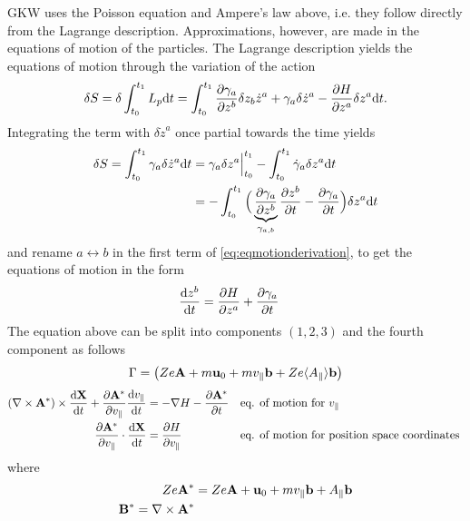 GKW uses the Poisson equation and Ampere's law above, i.e. they follow directly from the Lagrange description. 
Approximations, however, are made in the equations of motion of the particles. The Lagrange description yields the 
equations of motion through the variation of the action 
\begin{equation}
\delta S = \delta \int_{t_0}^{t_1} L_p {\rm d} t  
= \int_{t_0}^{t_1} \frac{\partial  \gamma_a}{\partial  z^b} \delta z_b \dot z^a + \gamma_a \delta \dot z^a - 
\frac{\partial  H}{\partial  z^a} \delta z^a {\rm d} t . 
\label{eq:eqmotionderivation}
\end{equation}
Integrating the term with $\delta \dot z^a$ once partial towards the time yields
\ifmoredetails
\begin{align}
\delta S = \int_{t_0}^{t_1}  \gamma_a \delta \dot z^a  {\rm d} t 
&=  \gamma_a \delta z^a\Big|_{t_0}^{t_1} - \int_{t_0}^{t_1} \dot\gamma_a \delta z^a  {\rm d} t \\
&=  - \int_{t_0}^{t_1} \Big(\underbrace{\frac{\partial \gamma_a}{\partial z^b}}_{\gamma_{a,b}}\frac{\partial z^b}{\partial t} - \frac{\partial \gamma_a}{\partial t}\Big)\delta z^a  {\rm d} t
\end{align}
and rename $a\leftrightarrow b$ in the first term of \eqref{eq:eqmotionderivation}, to get
\fi
  the equations of motion in the form 
\begin{align} 
[ \gamma_{b,a} - \gamma_{a,b} ] \d{z^b}{ t} &= \pd{ H}{ z^a} + \pd{ \gamma_a}{ t} \label{Lagrangemotion} 
\end{align}
The equation above can be split into components $(1,2,3)$ and the fourth component as follows 
\begin{align}
\Gamma = \left ( Z e {\bf A} + m {\bf u}_0 +  m v_\parallel {\bf b} + Z e \langle A_\parallel \rangle  {\bf b} \right )  
\end{align}
\begin{align}
(\nabla \times {\bf A}^*) \times \frac{\mathrm{d} \bf X}{\mathrm{d} t} + \frac{\partial {\bf A}^*}{\partial v_\parallel} \frac{\mathrm{d} v_\parallel}{\mathrm{d} t} 
&= - \nabla H - \frac{\partial {\bf A}^*}{\partial t} \label{eqmotion} &&\text{eq. of motion for $v_\parallel$}\\
\frac{\partial {\bf A}^*}{\partial v_\parallel} \cdot \frac{\mathrm{d} \bf X}{\mathrm{d} t} &= \frac{\partial H}{\partial v_\parallel} \label{eqmotion2} &&\text{eq. of motion for position space coordinates }
\end{align}
where 
\begin{align}
Z e {\bf A}^* &= Z e {\bf A} + {\bf u}_0 + m v_\parallel {\bf b} + A_\parallel {\bf b} 
\label{eq:Astar}
\\
{\bf B}^* = \nabla \times {\bf A}^*
\end{align}

